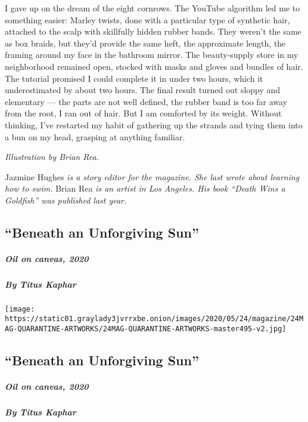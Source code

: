 I gave up on the dream of the eight cornrows. The YouTube algorithm led
me to something easier: Marley twists, done with a particular type of
synthetic hair, attached to the scalp with skillfully hidden rubber
bands. They weren't the same as box braids, but they'd provide the same
heft, the approximate length, the framing around my face in the bathroom
mirror. The beauty-supply store in my neighborhood remained open,
stocked with masks and gloves and bundles of hair. The tutorial promised
I could complete it in under two hours, which it underestimated by about
two hours. The final result turned out sloppy and elementary --- the
parts are not well defined, the rubber band is too far away from the
root, I ran out of hair. But I am comforted by its weight. Without
thinking, I've restarted my habit of gathering up the strands and tying
them into a bun on my head, grasping at anything familiar.

\emph{Illustration by Brian Rea.}

Jazmine Hughes \emph{is a story editor for the magazine. She last wrote
about learning how to swim.} Brian Rea \emph{is an artist in Los
Angeles. His book ``Death Wins a Goldfish'' was published last year.}

\hypertarget{beneath-an-unforgiving-sun-2}{%
\subsection{``Beneath an Unforgiving
Sun''}\label{beneath-an-unforgiving-sun-2}}

\hypertarget{oil-on-canvas-2020-2}{%
\subparagraph{Oil on canvas, 2020}\label{oil-on-canvas-2020-2}}

\hypertarget{by-titus-kaphar-2}{%
\subparagraph{By Titus Kaphar}\label{by-titus-kaphar-2}}

\texttt{[image: https://static01.graylady3jvrrxbe.onion/images/2020/05/24/magazine/24MAG-QUARANTINE-ARTWORKS/24MAG-QUARANTINE-ARTWORKS-master495-v2.jpg]}

\hypertarget{beneath-an-unforgiving-sun-3}{%
\subsection{``Beneath an Unforgiving
Sun''}\label{beneath-an-unforgiving-sun-3}}

\hypertarget{oil-on-canvas-2020-3}{%
\subparagraph{Oil on canvas, 2020}\label{oil-on-canvas-2020-3}}

\hypertarget{by-titus-kaphar-3}{%
\subparagraph{By Titus Kaphar}\label{by-titus-kaphar-3}}

